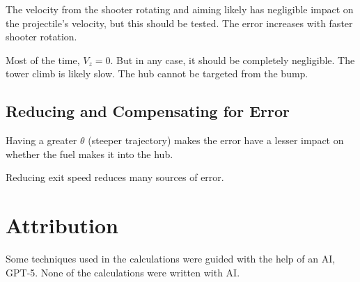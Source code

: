\documentclass{article}
\begin{document}
The velocity from the shooter rotating and aiming likely has negligible impact on the projectile's velocity, but this should be tested. The error increases with faster shooter rotation.

Most of the time, $V_z=0$. But in any case, it should be completely negligible. The tower climb is likely slow. The hub cannot be targeted from the bump.

\subsection*{Reducing and Compensating for Error}
Having a greater $\theta$ (steeper trajectory) makes the error have a lesser impact on whether the fuel makes it into the hub.

Reducing exit speed reduces many sources of error.

\section*{Attribution}
Some techniques used in the calculations were guided with the help of an AI, GPT-5. None of the calculations were written with AI.
\end{document}
